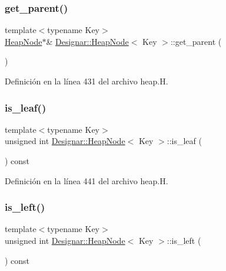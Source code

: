 \subsubsection{\texorpdfstring{get\+\_\+parent()}{get\_parent()}}
{\footnotesize\ttfamily template$<$typename Key$>$ \\
\hyperlink{class_designar_1_1_heap_node}{Heap\+Node}$\ast$\& \hyperlink{class_designar_1_1_heap_node}{Designar\+::\+Heap\+Node}$<$ Key $>$\+::get\+\_\+parent (\begin{DoxyParamCaption}{ }\end{DoxyParamCaption})\hspace{0.3cm}{\ttfamily [inline]}}



Definición en la línea 431 del archivo heap.\+H.

\mbox{\label{class_designar_1_1_heap_node_ad0b5b06b0126cdd711970709c4fb2187}} 
\subsubsection{\texorpdfstring{is\+\_\+leaf()}{is\_leaf()}}
{\footnotesize\ttfamily template$<$typename Key$>$ \\
unsigned int \hyperlink{class_designar_1_1_heap_node}{Designar\+::\+Heap\+Node}$<$ Key $>$\+::is\+\_\+leaf (\begin{DoxyParamCaption}{ }\end{DoxyParamCaption}) const\hspace{0.3cm}{\ttfamily [inline]}}



Definición en la línea 441 del archivo heap.\+H.

\mbox{\label{class_designar_1_1_heap_node_a778fa64fe1c4221eb7833cfb68713332}} 
\subsubsection{\texorpdfstring{is\+\_\+left()}{is\_left()}}
{\footnotesize\ttfamily template$<$typename Key$>$ \\
unsigned int \hyperlink{class_designar_1_1_heap_node}{Designar\+::\+Heap\+Node}$<$ Key $>$\+::is\+\_\+left (\begin{DoxyParamCaption}{ }\end{DoxyParamCaption}) const\hspace{0.3cm}{\ttfamily [inline]}}



